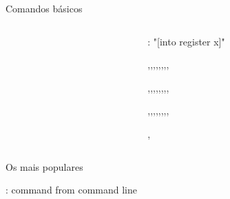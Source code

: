 \begin{frame}{Comandos básicos}
    \begin{columns}
        \begin{column}{0.5\linewidth}
            \begin{widedescription}
                \item {}
                \item {}
                \item {}
            \end{widedescription}
        \end{column}
        
        \begin{column}{0.5\textwidth}
            \begin{widedescription}
                \item \key{[x]}: "[into register x]"
                \begin{description}
                    \item {},,,,,,,, \\
                    \item {},,,,,,,, \\
                    \item {},,,,,,,, \\
                    \item {}, \end{description}
            \end{widedescription}
        \end{column}
    \end{columns}
\end{frame}

\begin{frame}{Os mais populares}
    \begin{widedescription}
        \item {}
        \item {}
        \item {}
        \item \key{[cmd]}: command from command line
    \end{widedescription}
\end{frame}

